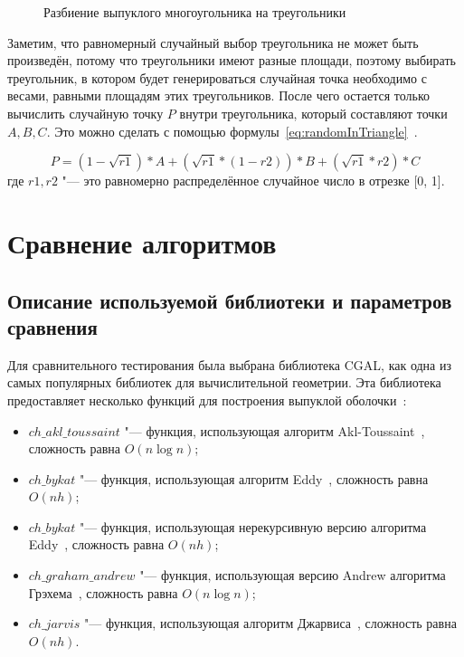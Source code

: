 \begin{figure}
	\centering
	
	\caption{Разбиение выпуклого многоугольника на треугольники}
	\label{img:triangles}
\end{figure}

Заметим, что равномерный случайный выбор треугольника не может быть произведён, потому что треугольники имеют разные площади, поэтому выбирать треугольник, в котором будет генерироваться случайная точка необходимо с весами, равными площадям этих треугольников. После чего остается только вычислить случайную точку $P$ внутри треугольника, который составляют точки $A, B, C$. Это можно сделать с помощью формулы~\eqref{eq:randomInTriangle}~\cite{osada2002shape}.

\begin{equation}\label{eq:randomInTriangle}
P = (1 - \sqrt{r1}) * A + (\sqrt{r1} * (1 - r2)) * B + (\sqrt{r1} * r2) * C
\end{equation}
где $r1, r2$ "--- это равномерно распределённое случайное число в отрезке [0, 1].

\section{Сравнение алгоритмов}

\subsection{Описание используемой библиотеки и параметров сравнения}

Для сравнительного тестирования была выбрана библиотека CGAL, как одна из самых популярных библиотек для вычислительной геометрии. Эта библиотека предоставляет несколько функций для построения выпуклой оболочки~\cite{cgalconvexhull}:
\begin{itemize}
	\item $ch\_akl\_toussaint$ "--- функция, использующая алгоритм Akl-Toussaint~\cite{akl1978fast}, сложность равна $O(n \log n)$;
	\item $ch\_bykat$ "--- функция, использующая алгоритм Eddy~\cite{eddy1977new}, сложность равна $O(nh)$;
	\item $ch\_bykat$ "--- функция, использующая нерекурсивную версию алгоритма Eddy~\cite{bykat1978convex}, сложность равна $O(nh)$;
	\item $ch\_graham\_andrew$ "--- функция, использующая версию Andrew алгоритма Грэхема~\cite{andrew1979another}, сложность равна $O(n \log n)$;
	\item $ch\_jarvis$ "--- функция, использующая алгоритм Джарвиса~\cite{jarvis1973Jarvis}, сложность равна $O(nh)$.
\end{itemize}

